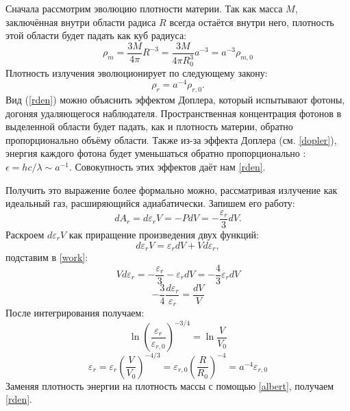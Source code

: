 Сначала рассмотрим эволюцию плотности материи. Так как масса $M$, заключённая внутри области радиса $R$ всегда остаётся внутри него, плотность этой области будет падать как куб радиуса:
\begin{equation}
\rho_{m} = \frac{3M}{4 \pi} R^{-3} = \frac{3M}{4 \pi R_{0}^{3}} a^{-3} = a^{-3} \rho_{m,0}
\label{mden}
\end{equation}
Плотность излучения эволюционирует по следующему закону:
\begin{equation}
\rho_r = a^{-4} \rho_{r,0}.
\label{rden}
\end{equation}
Вид (\ref{rden}) можно объяснить эффектом Доплера, который испытывают фотоны, догоняя удаляющегося наблюдателя. Пространственная концентрация фотонов в выделенной области будет падать, как и плотность материи, обратно пропорционально объёму области. Также из-за эффекта Доплера (см. \ref{dopler}), энергия каждого фотона будет уменьшаться обратно пропорционально : $\epsilon = hc/\lambda \sim a^{-1}$. Совокупность этих эффектов даёт нам \eqref{rden}.

Получить это выражение более формально можно, рассматривая излучение как идеальный газ, расширяющийся адиабатически. Запишем его работу:
\begin{equation}
dA_r = d\varepsilon_r V = -P dV = -\frac{\varepsilon_r}{3} dV.
\label{work}
\end{equation}
Раскроем $d\varepsilon_r V$ как приращение произведения двух функций:
$$
d\varepsilon_r V = \varepsilon_r dV + Vd\varepsilon_r,
$$
подставим в \eqref{work}:
$$
Vd\varepsilon_r = -\frac{\varepsilon_r}{3} - \varepsilon _r dV = -\frac{4}{3} \varepsilon_r dV
$$
$$
-\frac{3}{4} \frac{d\varepsilon_r}{\varepsilon_r} = \frac{dV}{V}
$$
После интегрирования получаем:
$$
\ln \left(\frac{\varepsilon_r}{\varepsilon_{r,0}}\right)^{-3/4} = \ln \frac{V}{V_0}
$$
\begin{equation}
\varepsilon_r = \varepsilon_r \left( \frac{V}{V_0} \right)^{-4/3} = \varepsilon_{r,0} \left( \frac{R}{R_0} \right)^{-4} = a^{-4} \varepsilon_{r,0}
\end{equation}
Заменяя плотность энергии на плотность массы с помощью \eqref{albert}, получаем \eqref{rden}.


